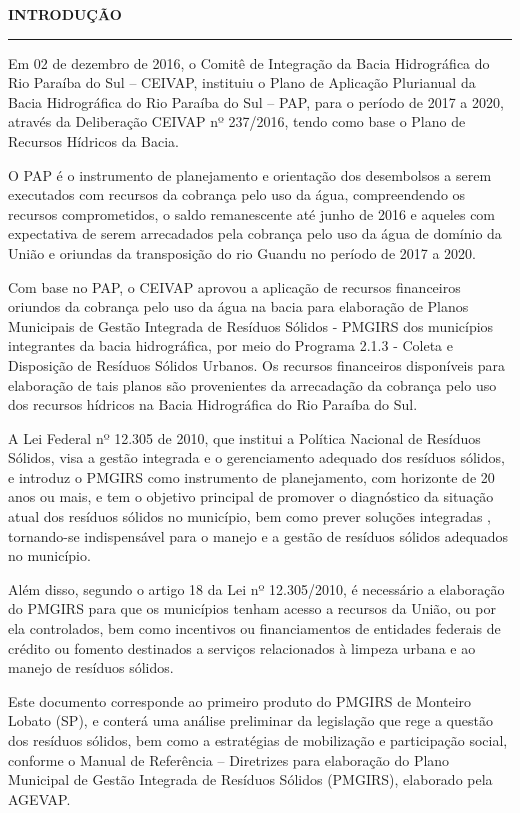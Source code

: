\begin{center}
	{\bfseries\Large\MakeUppercase{Introdução}}
	\noindent\rule{\textwidth}{0.4pt}
\end{center}
\vspace{1.5em}

Em 02 de dezembro de 2016, o Comitê de Integração da Bacia Hidrográfica do Rio Paraíba do Sul – CEIVAP, instituiu o Plano de Aplicação Plurianual da Bacia Hidrográfica do Rio Paraíba do Sul – PAP, para o período de 2017 a 2020, através da Deliberação CEIVAP nº 237/2016, tendo como base o Plano de Recursos Hídricos da Bacia.

O PAP é o instrumento de planejamento e orientação dos desembolsos a serem executados com recursos da cobrança pelo uso da água, compreendendo os recursos comprometidos, o saldo remanescente até junho de 2016 e aqueles com expectativa de serem arrecadados pela cobrança pelo uso da água de domínio da União e oriundas da transposição do rio Guandu no período de 2017 a 2020.

Com base no PAP, o CEIVAP aprovou a aplicação de recursos financeiros oriundos da cobrança pelo uso da água na bacia para elaboração de Planos Municipais de Gestão Integrada de Resíduos Sólidos - PMGIRS dos municípios integrantes da bacia hidrográfica, por meio do Programa 2.1.3 - Coleta e Disposição de Resíduos Sólidos Urbanos. Os recursos financeiros disponíveis para elaboração de tais planos são provenientes da arrecadação da cobrança pelo uso dos recursos hídricos na Bacia Hidrográfica do Rio Paraíba do Sul.

A Lei Federal nº 12.305 de 2010, que institui a Política Nacional de Resíduos Sólidos, visa a gestão integrada e o gerenciamento adequado dos resíduos sólidos, e introduz o PMGIRS como instrumento de planejamento, com horizonte de 20 anos ou mais, e tem o objetivo principal de promover o diagnóstico da situação atual dos resíduos sólidos no município, bem como prever soluções integradas  \cite{Brasil2010}, tornando-se indispensável para o manejo e a gestão de resíduos sólidos adequados no município.

Além disso, segundo o artigo 18 da Lei nº 12.305/2010, é necessário a elaboração do PMGIRS para que os municípios tenham acesso a recursos da União, ou por ela controlados, bem como incentivos ou financiamentos de entidades federais de crédito ou fomento destinados a serviços relacionados à limpeza urbana e ao manejo de resíduos sólidos.

Este documento corresponde ao primeiro produto do PMGIRS de Monteiro Lobato (SP), e conterá uma análise preliminar da legislação que rege a questão dos resíduos sólidos, bem como a estratégias de mobilização e participação social, conforme o Manual de Referência – Diretrizes para elaboração do Plano Municipal de Gestão Integrada de Resíduos Sólidos (PMGIRS), elaborado pela AGEVAP.
